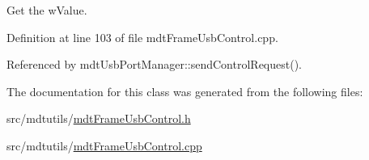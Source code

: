 Get the w\-Value. 



Definition at line 103 of file mdt\-Frame\-Usb\-Control.\-cpp.



Referenced by mdt\-Usb\-Port\-Manager\-::send\-Control\-Request().



The documentation for this class was generated from the following files\-:\begin{DoxyCompactItemize}
\item 
src/mdtutils/\hyperlink{mdt_frame_usb_control_8h}{mdt\-Frame\-Usb\-Control.\-h}\item 
src/mdtutils/\hyperlink{mdt_frame_usb_control_8cpp}{mdt\-Frame\-Usb\-Control.\-cpp}\end{DoxyCompactItemize}
